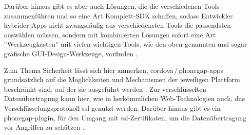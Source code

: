 Darüber hinaus gibt es aber auch Lösungen, die die verschiedenen Tools zusammenführen und so eine Art Komplett-SDK schaffen, sodass Entwickler hybrider Apps nicht zwangsläufig aus verschiedensten Tools die passendsten auswählen müssen, sondern mit kombinierten Lösungen sofort eine Art ”Werkzeugkasten”  mit vielen wichtigen Tools, wie den oben genannten und sogar grafische GUI-Design-Werkzeuge, vorfinden \cite{DaVinci, xdk, sencha}.








Zum Thema Sicherheit lässt sich hier anmerken, \gls{cordova}\,/\,\gls{phonegap}-\glspl{app} grundsätzlich auf die Möglichkeiten und Mechanismen der jeweiligen Plattform beschränkt sind, auf der sie ausgeführt werden \cite{phonegap_security}.
Zur verschlüsselten Datenübertragung kann hier, wie in herkömmlichen Web-Technologien auch, das Verschlüsselungsprotokoll \gls{ssl} genutzt werden.
Darüber hinaus gibt es ein \gls{phonegap}-\gls{plugin}, für den Umgang mit \gls{ssl}-Zertifikaten, um die Datenübertragung vor Angriffen zu schützen \cite{phonegap_ssl_checker}.

